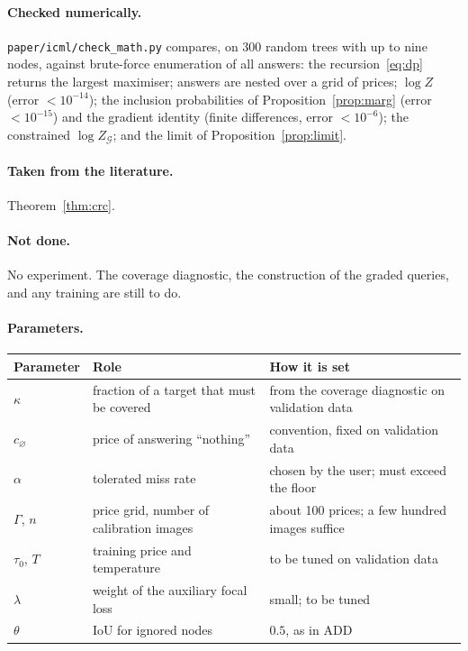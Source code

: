 \documentclass[11pt,a4paper]{article}
\theoremstyle{definition}
\theoremstyle{remark}
\newcommand{\nul}{\varnothing}
\newcommand{\cG}{\mathcal{G}}
\begin{document}
\paragraph{Checked numerically.} \texttt{paper/icml/check\_math.py} compares, on 300 random trees with up to nine
nodes, against brute-force enumeration of all answers: the recursion~\eqref{eq:dp} returns the largest maximiser;
answers are nested over a grid of prices; $\log Z$ (error $<10^{-14}$); the inclusion probabilities of
Proposition~\ref{prop:marg} (error $<10^{-15}$) and the gradient identity (finite differences, error $<10^{-6}$);
the constrained $\log Z_\cG$; and the limit of Proposition~\ref{prop:limit}.

\paragraph{Taken from the literature.} Theorem~\ref{thm:crc}.

\paragraph{Not done.} No experiment. The coverage diagnostic, the construction of the graded queries, and any
training are still to do.

\paragraph{Parameters.}
\begin{center}
\begin{tabular}{lL{6.2cm}L{5.2cm}}
\toprule
Parameter & Role & How it is set \\
\midrule
$\kappa$ & fraction of a target that must be covered & from the coverage diagnostic on validation data \\
$c_\nul$ & price of answering ``nothing'' & convention, fixed on validation data \\
$\alpha$ & tolerated miss rate & chosen by the user; must exceed the floor \\
$\Gamma$, $n$ & price grid, number of calibration images & about 100 prices; a few hundred images suffice \\
$\tau_0$, $T$ & training price and temperature & to be tuned on validation data \\
$\lambda$ & weight of the auxiliary focal loss & small; to be tuned \\
$\theta$ & IoU for ignored nodes & $0.5$, as in ADD \\
\bottomrule
\end{tabular}
\end{center}
\end{document}
